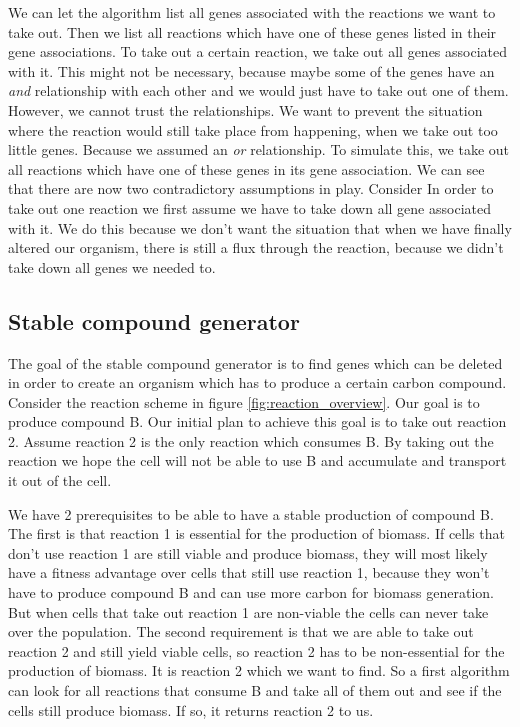 \documentclass[12pt]{report}
\begin{document}
We can let the algorithm list all genes associated with the reactions we want to take out. Then we list all reactions which have one of these genes listed in their gene associations. To take out a certain reaction, we take out all genes associated with it. This might not be necessary, because maybe some of the genes have an \emph{and} relationship with each other and we would just have to take out one of them. However, we cannot trust the relationships. We want to prevent the situation where the reaction would still take place from happening, when we take out too little genes. Because we assumed an \emph{or} relationship. To simulate this, we take out all reactions which have one of these genes in its gene association. We can see that there are now two contradictory assumptions in play. Consider  In order to take out one reaction we first assume we have to take down all gene associated with it. We do this because we don't want the situation that when we have finally altered our organism, there is still a flux through the reaction, because we didn't take down all genes we needed to.


\subsection{Stable compound generator}
The goal of the stable compound generator is to find genes which can be deleted in order to create an organism which has to produce a certain carbon compound. Consider the reaction scheme in figure \ref{fig:reaction_overview}. Our goal is to produce compound B. Our initial plan to achieve this goal is to take out reaction 2. Assume reaction 2 is the only reaction which consumes B. By taking out the reaction we hope the cell will not be able to use B and accumulate and transport it out of the cell.

We have 2 prerequisites to be able to have a stable production of compound B. The first is that reaction 1 is essential for the production of biomass. If cells that don't use reaction 1 are still viable and produce biomass, they will most likely have a fitness advantage over cells that still use reaction 1, because they won't have to produce compound B and can use more carbon for biomass generation. But when cells that take out reaction 1 are non-viable the cells can never take over the population.
The second requirement is that we are able to take out reaction 2 and still yield viable cells, so reaction 2 has to be non-essential for the production of biomass. It is reaction 2 which we want to find. So a first algorithm can look for all reactions that consume B and take all of them out and see if the cells still produce biomass. If so, it returns reaction 2 to us.
\end{document}
